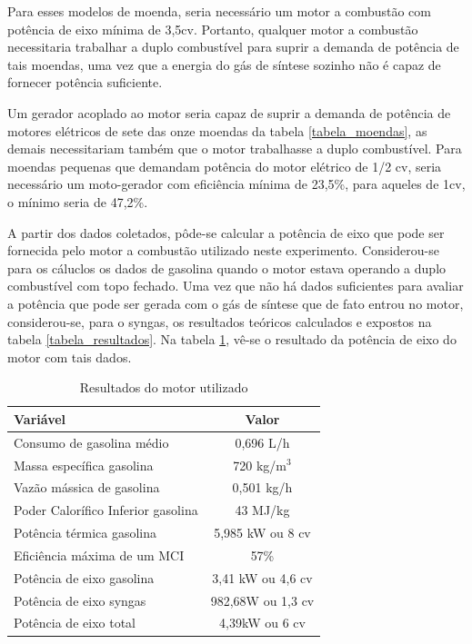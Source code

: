 Para esses modelos de moenda, seria necessário um motor a combustão com potência de eixo mínima de 3,5cv. Portanto, qualquer motor a combustão necessitaria trabalhar a duplo combustível para suprir a demanda de potência de tais moendas, uma vez que a energia do gás de síntese sozinho não é capaz de fornecer potência suficiente.

Um gerador acoplado ao motor seria capaz de suprir a demanda de potência de motores elétricos de sete das onze moendas da tabela \ref{tabela_moendas}, as demais necessitariam também que o motor trabalhasse a duplo combustível. Para moendas pequenas que demandam potência do motor elétrico de 1/2 cv, seria necessário um moto-gerador com eficiência mínima de 23,5\%, para aqueles de 1cv, o mínimo seria de 47,2\%.

A partir dos dados coletados, pôde-se calcular a potência de eixo que pode ser fornecida pelo motor a combustão utilizado neste experimento. Considerou-se para os cáluclos os dados de gasolina quando o motor estava operando a duplo combustível com topo fechado. Uma vez que não há dados suficientes para avaliar a potência que pode ser gerada com o gás de síntese que de fato entrou no motor, considerou-se, para o syngas, os resultados teóricos calculados e expostos na tabela \ref{tabela_resultados}. Na tabela \ref{tabela_potencia_motor_fiat}, vê-se o resultado da potência de eixo do motor com tais dados.

\begin{table}[h]
	\centering
	\caption{Resultados do motor utilizado}
	\begin{tabular}{|l|c|}
		\hline
		\rowcolor{lightgray} Variável & Valor \\
		\hline
		Consumo de gasolina médio & 0,696 L/h \\
		Massa específica gasolina & 720 kg/m$^3$ \\
		Vazão mássica de gasolina & 0,501 kg/h \\
		Poder Calorífico Inferior gasolina & 43 MJ/kg \\
		Potência térmica gasolina & 5,985 kW ou 8 cv\\
		Eficiência máxima de um MCI & 57\% \\
		 Potência de eixo gasolina & 3,41 kW ou 4,6 cv \\
		 Potência de eixo syngas & 982,68W ou 1,3 cv \\
		 Potência de eixo total & 4,39kW ou 6 cv \\
		\hline
	\end{tabular}
	\label{tabela_potencia_motor_fiat}
\end{table}	


